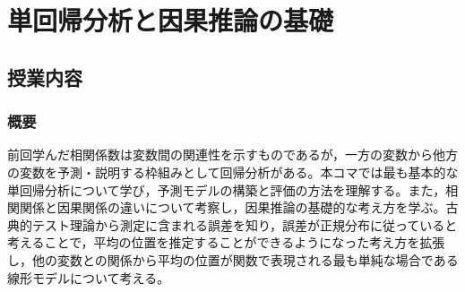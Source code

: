 \section{単回帰分析と因果推論の基礎}
\label{b07_Regression}

\subsection{授業内容}

\subsubsection{概要}
前回学んだ相関係数は変数間の関連性を示すものであるが，一方の変数から他方の変数を予測・説明する枠組みとして回帰分析がある。本コマでは最も基本的な単回帰分析について学び，予測モデルの構築と評価の方法を理解する。また，相関関係と因果関係の違いについて考察し，因果推論の基礎的な考え方を学ぶ。古典的テスト理論から測定に含まれる誤差を知り，誤差が正規分布に従っていると考えることで，平均の位置を推定することができるようになった考え方を拡張し，他の変数との関係から平均の位置が関数で表現される最も単純な場合である線形モデルについて考える。

